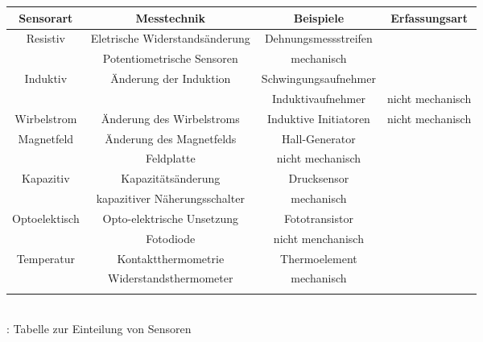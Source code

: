 \documentclass{article}
\begin{document}
				\begin{tabular}{c|c|c|c}
					
					\hline
					\textbf {Sensorart} & \textbf{Messtechnik} & \textbf {Beispiele} & \textbf{Erfassungsart}\\
					\hline
					
					Resistiv & Eletrische Widerstandsänderung & Dehnungsmessstreifen \\
					& Potentiometrische Sensoren &  mechanisch\\
					
					
					\hline
					Induktiv & Änderung der Induktion & Schwingungsaufnehmer \\
					&& Induktivaufnehmer & nicht mechanisch\\
					\hline
					
					Wirbelstrom & Änderung des Wirbelstroms & Induktive Initiatoren & nicht mechanisch\\
					\hline
					
					Magnetfeld & Änderung des Magnetfelds & Hall-Generator\\
					& Feldplatte & nicht mechanisch\\
					\hline
					
					Kapazitiv & Kapazitätsänderung & Drucksensor\\
					& kapazitiver Näherungsschalter & mechanisch\\
					\hline
					
					Optoelektisch & Opto-elektrische Unsetzung & Fototransistor\\
					& Fotodiode & nicht menchanisch \\
					\hline
					
					Temperatur & Kontaktthermometrie & Thermoelement\\
					& Widerstandsthermometer & mechanisch\\
					\hline}
								
					\end{tabular}
					\\

					\caption{ \cite{TS02}: Tabelle zur Einteilung von Sensoren}\\
				
\end{document}
